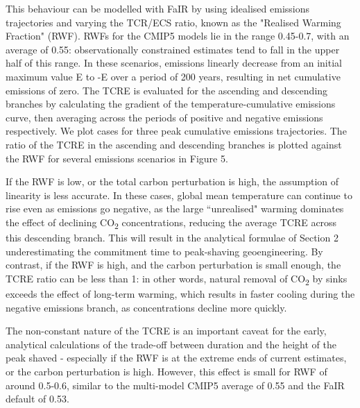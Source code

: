 \documentclass[draft]{agujournal2019}
\begin{document}
This behaviour can be modelled with FaIR by using idealised emissions trajectories and varying the TCR/ECS ratio, known as the "Realised Warming Fraction" (RWF). RWFs for the CMIP5 models lie in the range 0.45-0.7, with an average of 0.55: observationally constrained estimates tend to fall in the upper half of this range. \cite{millar2017modified} In these scenarios, emissions linearly decrease from an initial maximum value E to -E over a period of 200 years, resulting in net cumulative emissions of zero. The TCRE is evaluated for the ascending and descending branches by calculating the gradient of the temperature-cumulative emissions curve, then averaging across the periods of positive and negative emissions respectively. We plot cases for three peak cumulative emissions trajectories. The ratio of the TCRE in the ascending and descending branches is plotted against the RWF for several emissions scenarios in Figure 5. 


If the RWF is low, or the total carbon perturbation is high, the assumption of linearity is less accurate. In these cases, global mean temperature can continue to rise even as emissions go negative, as the large ``unrealised" warming dominates the effect of declining CO\textsubscript{2} concentrations, reducing the average TCRE across this descending branch. This will result in the analytical formulae of Section 2 underestimating the commitment time to peak-shaving geoengineering. By contrast, if the RWF is high, and the carbon perturbation is small enough, the TCRE ratio can be less than 1: in other words, natural removal of CO\textsubscript{2} by sinks exceeds the effect of long-term warming, which results in faster cooling during the negative emissions branch, as concentrations decline more quickly. 

The non-constant nature of the TCRE is an important caveat for the early, analytical calculations of the trade-off between duration and the height of the peak shaved - especially if the RWF is at the extreme ends of current estimates, or the carbon perturbation is high. However, this effect is small for RWF of around 0.5-0.6, similar to the multi-model CMIP5 average of 0.55 and the FaIR default of 0.53. 









\newpage
\end{document}
